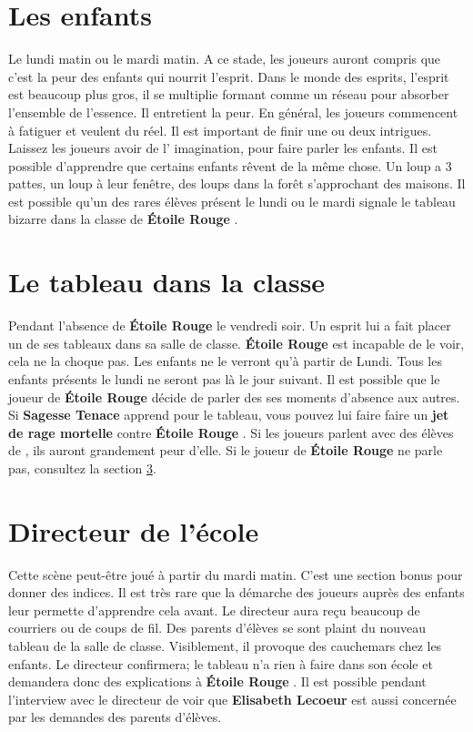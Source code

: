 \documentclass[oneside,12pt]{book}
\newcommand{\Lynn}{\textbf{Étoile Rouge} }
\newcommand{\Jessica}{\textbf{Sagesse Tenace} }
\newcommand{\Elisabeth}{\textbf{Elisabeth Lecoeur} }
\begin{document}
\begin{flushleft}
\section{Les enfants}
Le lundi matin ou le mardi matin.
A ce stade, les joueurs auront compris que c'est la peur des enfants qui nourrit l'esprit.
Dans le monde des esprits, l'esprit est beaucoup plus gros, il se multiplie formant comme un réseau pour absorber l'ensemble de l'essence. Il entretient la peur. En général, les joueurs commencent à fatiguer et veulent du réel. Il est important de finir une ou deux intrigues. Laissez les joueurs avoir de l' imagination, pour faire parler les enfants. Il est possible d'apprendre que certains enfants rêvent de la même chose. 
Un loup a 3 pattes, un loup à leur fenêtre, des loups dans la forêt s'approchant des maisons. Il est possible qu'un des rares élèves présent le lundi ou le mardi signale le tableau bizarre dans la classe de \Lynn . 

\section{Le tableau dans la classe}
Pendant l'absence de \Lynn le vendredi soir. Un esprit lui a fait placer un de ses tableaux dans sa salle de classe. \Lynn est incapable de le voir, cela ne la choque pas. Les enfants ne le verront qu'à partir de Lundi. Tous les enfants présents le lundi ne seront pas là le jour suivant. 
Il est possible que le joueur de \Lynn décide de parler des ses moments d'absence aux autres. 
Si \Jessica apprend pour le tableau, vous pouvez lui faire faire un \textbf{jet de rage mortelle} contre \Lynn . Si les joueurs parlent avec des élèves de \lynn, ils auront grandement peur d'elle.
Si le joueur de \Lynn ne parle pas, consultez la section \ref{directeur}.

\section{Directeur de l'école}
\label{directeur}
Cette scène peut-être joué à partir du mardi matin. C'est une section bonus pour donner des indices. Il est très rare que la démarche des joueurs auprès des enfants leur permette d'apprendre cela avant. 
Le directeur aura reçu beaucoup de courriers ou de coups de fil. Des parents d'élèves se sont plaint du nouveau tableau de la salle de classe. Visiblement, il provoque des cauchemars chez les enfants. Le directeur confirmera; le tableau n'a rien à faire dans son école et demandera donc des explications à \Lynn. Il est possible pendant l'interview avec le directeur de voir que \Elisabeth est aussi concernée par les demandes des parents d’élèves.



\end{flushleft}
\end{document}
